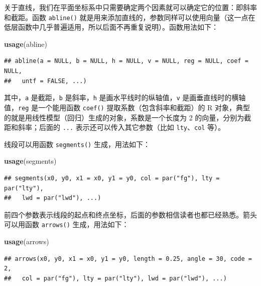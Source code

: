 \documentclass[
  b5paper,
  UTF8,twoside]{book}
\newenvironment{Shaded}{\begin{snugshade}}{\end{snugshade}}
\newcommand{\FunctionTok}[1]{\textcolor[rgb]{0.13,0.29,0.53}{\textbf{#1}}}
\newcommand{\NormalTok}[1]{#1}
\begin{document}
关于直线，我们在平面坐标系中只需要确定两个因素就可以确定它的位置：即斜率和截距。函数 \texttt{abline()} 就是用来添加直线的，参数同样可以使用向量（这一点在低层函数中几乎普遍适用，所以后面不再重复说明）。函数用法如下：

\begin{Shaded}
\begin{Highlighting}[]
\FunctionTok{usage}\NormalTok{(abline)}
\end{Highlighting}
\end{Shaded}

\begin{verbatim}
## abline(a = NULL, b = NULL, h = NULL, v = NULL, reg = NULL, coef = NULL,
##   untf = FALSE, ...)
\end{verbatim}

其中，\texttt{a} 是截距，\texttt{b} 是斜率，\texttt{h} 是画水平线时的纵轴值，\texttt{v} 是画垂直线时的横轴值，\texttt{reg} 是一个能用函数 \texttt{coef()} 提取系数（包含斜率和截距）的 R 对象，典型的就是用线性模型（回归）生成的对象，系数是一个长度为 2 的向量，分别为截距和斜率；后面的 \texttt{...} 表示还可以传入其它参数（比如 \texttt{lty}、\texttt{col} 等）。

线段可以用函数 \texttt{segments()} 生成，用法如下：

\begin{Shaded}
\begin{Highlighting}[]
\FunctionTok{usage}\NormalTok{(segments)}
\end{Highlighting}
\end{Shaded}

\begin{verbatim}
## segments(x0, y0, x1 = x0, y1 = y0, col = par("fg"), lty = par("lty"),
##   lwd = par("lwd"), ...)
\end{verbatim}

前四个参数表示线段的起点和终点坐标，后面的参数相信读者也都已经熟悉。箭头可以用函数 \texttt{arrows()} 生成，用法如下：

\begin{Shaded}
\begin{Highlighting}[]
\FunctionTok{usage}\NormalTok{(arrows)}
\end{Highlighting}
\end{Shaded}

\begin{verbatim}
## arrows(x0, y0, x1 = x0, y1 = y0, length = 0.25, angle = 30, code = 2,
##   col = par("fg"), lty = par("lty"), lwd = par("lwd"), ...)
\end{verbatim}
\end{document}
